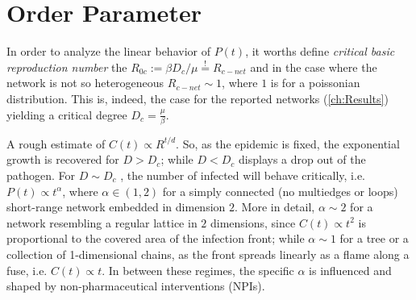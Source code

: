 \documentclass[a4paper,10pt,twoside]{book} %
\theoremstyle{definition}
\begin{document}
\section*{Order Parameter}
\label{sec:OrderParam4LinContagion}
In order to analyze the linear behavior of $P(t)$, it worths define \textit{critical basic reproduction number} the  $R_{0c} := \beta D_c / \mu \stackrel{!}{=} R_{c-net}$ and in the case where the network is not so heterogeneous $ R_{c-net} \sim 1$, where $1$ is for a poissonian distribution. This is, indeed, the case for the reported networks (\autoref{ch:Results}) yielding a critical degree $D_c = \frac{\mu}{\beta}$. 

A rough estimate of $C(t) \propto R^{t/d}$. So, as the epidemic is fixed, the exponential growth is recovered for $D > D_c$; while $D < D_c$ displays a drop out of the pathogen. For $D \sim D_c$ \cite{Thurner::NetBasedExpl}, the number of infected will behave critically, i.e. $P(t) \propto t^{\alpha}$, where $\alpha \in (1,2)$ for a simply connected (no multiedges or loops) short-range network embedded in dimension $2$. More in detail, $\alpha \sim 2$ for a network resembling a regular lattice in $2$ dimensions, since $C(t) \propto t^2$ is proportional to the covered area of the infection front; while $\alpha \sim 1$ for a tree or a collection of 1-dimensional chains, as the front spreads linearly as a flame along a fuse, i.e. $C(t) \propto t$. In between these regimes, the specific $\alpha$ is influenced and shaped by non-pharmaceutical interventions (NPIs).
\end{document}
